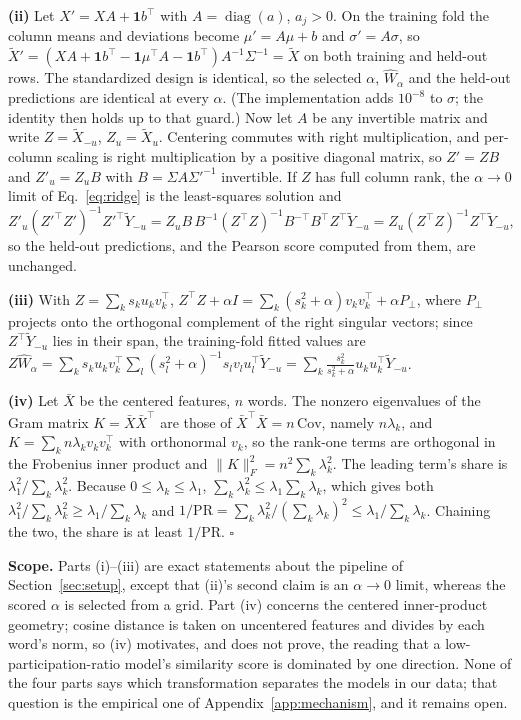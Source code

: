 \documentclass{article}
\begin{document}
\textbf{(ii)} Let $X'=XA+\mathbf 1b^\top$ with $A=\operatorname{diag}(a)$, $a_j>0$. On the training
fold the column means and deviations become $\mu'=A\mu+b$ and $\sigma'=A\sigma$, so
$\tilde X'=(XA+\mathbf 1b^\top-\mathbf 1\mu^\top A-\mathbf 1b^\top)A^{-1}\Sigma^{-1}=\tilde X$ on both
training and held-out rows. The standardized design is identical, so the selected $\alpha$,
$\hat W_\alpha$ and the held-out predictions are identical at every $\alpha$. (The implementation
adds $10^{-8}$ to $\sigma$; the identity then holds up to that guard.) Now let $A$ be any
invertible matrix and write $Z=\tilde X_{-u}$, $Z_u=\tilde X_u$. Centering commutes with right
multiplication, and per-column scaling is right multiplication by a positive diagonal matrix, so
$Z'=ZB$ and $Z'_u=Z_uB$ with $B=\Sigma A\Sigma'^{-1}$ invertible. If $Z$ has full column rank, the
$\alpha\to0$ limit of Eq.~\eqref{eq:ridge} is the least-squares solution and
\[
Z'_u(Z'^\top Z')^{-1}Z'^\top\tilde Y_{-u}=Z_uB\,B^{-1}(Z^\top Z)^{-1}B^{-\top}B^\top Z^\top\tilde Y_{-u}
=Z_u(Z^\top Z)^{-1}Z^\top\tilde Y_{-u},
\]
so the held-out predictions, and the Pearson score computed from them, are unchanged.

\textbf{(iii)} With $Z=\sum_k s_k u_kv_k^\top$, $Z^\top Z+\alpha I=\sum_k(s_k^2+\alpha)v_kv_k^\top
+\alpha P_\perp$, where $P_\perp$ projects onto the orthogonal complement of the right singular
vectors; since $Z^\top\tilde Y_{-u}$ lies in their span, the training-fold fitted values are
$Z\hat W_\alpha=\sum_k s_k u_kv_k^\top\sum_l(s_l^2+\alpha)^{-1}s_l v_lu_l^\top\tilde Y_{-u}
=\sum_k\frac{s_k^2}{s_k^2+\alpha}u_ku_k^\top\tilde Y_{-u}$.

\textbf{(iv)} Let $\bar X$ be the centered features, $n$ words. The nonzero eigenvalues of the Gram
matrix $K=\bar X\bar X^\top$ are those of $\bar X^\top\bar X=n\,\mathrm{Cov}$, namely $n\lambda_k$,
and $K=\sum_k n\lambda_k v_kv_k^\top$ with orthonormal $v_k$, so the rank-one terms are orthogonal in
the Frobenius inner product and $\|K\|_F^2=n^2\sum_k\lambda_k^2$. The leading term's share is
$\lambda_1^2/\sum_k\lambda_k^2$. Because $0\le\lambda_k\le\lambda_1$, $\sum_k\lambda_k^2\le
\lambda_1\sum_k\lambda_k$, which gives both $\lambda_1^2/\sum_k\lambda_k^2\ge\lambda_1/\sum_k\lambda_k$
and $1/\mathrm{PR}=\sum_k\lambda_k^2/(\sum_k\lambda_k)^2\le\lambda_1/\sum_k\lambda_k$. Chaining the two,
the share is at least $1/\mathrm{PR}$. \hfill$\square$

\textbf{Scope.} Parts (i)--(iii) are exact statements about the pipeline of
Section~\ref{sec:setup}, except that (ii)'s second claim is an $\alpha\to0$ limit, whereas the
scored $\alpha$ is selected from a grid. Part (iv) concerns the centered inner-product geometry;
cosine distance is taken on uncentered features and divides by each word's norm, so (iv) motivates, and does not prove, the
reading that a low-participation-ratio model's similarity score is dominated by one direction. None
of the four parts says which transformation separates the models in our data; that question is
the empirical one of Appendix~\ref{app:mechanism}, and it remains open.
\end{document}
